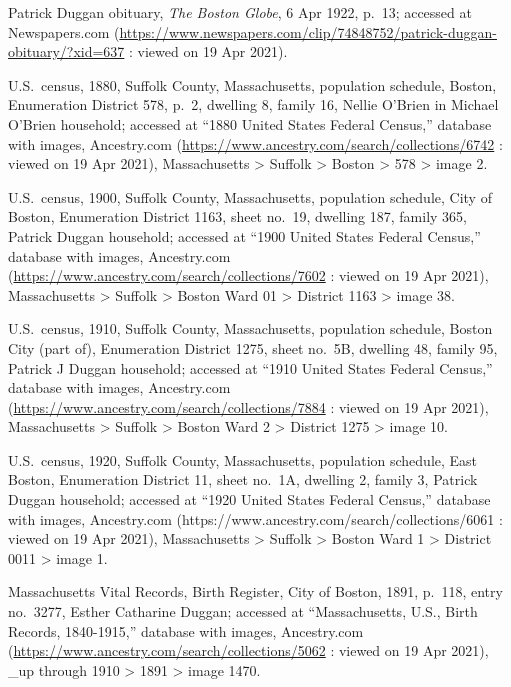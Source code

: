 \begin{thebibliography}{999}
Patrick Duggan obituary, \textit{The Boston Globe}, 6 Apr 1922, p.\ 13; accessed at Newspapers.com (\url{https://www.newspapers.com/clip/74848752/patrick-duggan-obituary/?xid=637} : viewed on 19 Apr 2021).

U.S.\ census, 1880, Suffolk County, Massachusetts, population schedule, Boston, Enumeration District 578, p.\ 2, dwelling 8, family 16, Nellie O'Brien in Michael O'Brien household; accessed at ``1880 United States Federal Census,'' database with images, Ancestry.com (\url{https://www.ancestry.com/search/collections/6742} : viewed on 19 Apr 2021), Massachusetts > Suffolk > Boston > 578 > image 2.

U.S.\ census, 1900, Suffolk County, Massachusetts, population schedule, City of Boston, Enumeration District 1163, sheet no.\ 19, dwelling 187, family 365, Patrick Duggan household; accessed at ``1900 United States Federal Census,'' database with images, Ancestry.com (\url{https://www.ancestry.com/search/collections/7602} : viewed on 19 Apr 2021), Massachusetts > Suffolk > Boston Ward 01 > District 1163 > image 38.

U.S.\ census, 1910, Suffolk County, Massachusetts, population schedule, Boston City (part of), Enumeration District 1275, sheet no.\ 5B, dwelling 48, family 95, Patrick J Duggan household; accessed at ``1910 United States Federal Census,'' database with images, Ancestry.com (\url{https://www.ancestry.com/search/collections/7884} : viewed on 19 Apr 2021), Massachusetts > Suffolk > Boston Ward 2 > District 1275 > image 10.

U.S.\ census, 1920, Suffolk County, Massachusetts, population schedule, East Boston, Enumeration District 11, sheet no.\ 1A, dwelling 2, family 3, Patrick Duggan household; accessed at ``1920 United States Federal Census,'' database with images, Ancestry.com (https://www.ancestry.com/search/collections/6061 : viewed on 19 Apr 2021), Massachusetts > Suffolk > Boston Ward 1 > District 0011 > image 1.

Massachusetts Vital Records, Birth Register, City of Boston, 1891, p.\ 118, entry no.\ 3277, Esther Catharine Duggan; accessed at ``Massachusetts, U.S., Birth Records, 1840-1915,'' database with images, Ancestry.com (\url{https://www.ancestry.com/search/collections/5062} : viewed on 19 Apr 2021), \_up through 1910 > 1891 > image 1470.


\end{thebibliography}
